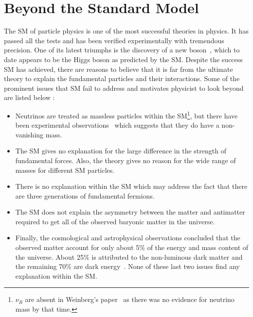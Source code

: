 \section{Beyond the Standard Model}
The SM of particle physics is one of the most successful theories in physics. It has passed all the tests and has been verified
experimentally with tremendous precision. One of its latest triumphs is the discovery of a new boson~\cite{Chatrchyan:2012xdj,Aad:2012tfa}, 
which to date appears to be the Higgs boson as predicted by the SM. Despite the success SM has achieved, there are reasons to believe that it is
far from the ultimate theory to explain the fundamental particles and their interactions. Some of the prominent issues that SM fail to address
and motivates physicist to look beyond are listed below :
\begin{itemize}
\item Neutrinos are treated as massless particles within the SM\footnote{$\nu_{R}$ are absent in Weinberg's paper~\cite{Weinberg:1967tq} as there was no 
evidence for neutrino mass by that time.}, but there have been experimental 
observations~\cite{Fukuda:1998mi,Fukuda:2001nk,Araki:2004mb,Michael:2006rx} which suggests that they do have a non-vanishing mass.

\item The SM gives no explanation for the large difference in the strength of fundamental forces. Also, the theory gives no reason for the wide 
range of masses for different SM particles. %

\item There is no explanation within the SM which may address the fact that there are three generations of fundamental fermions.
\item The SM does not explain the asymmetry between the matter and antimatter required to get all of the observed baryonic matter in the universe. 

\item Finally, the cosmological and astrophysical observations concluded that the observed matter account for only about 5\% of the energy
and mass content of the universe. About 25\% is attributed to the non-luminous dark matter and the remaining 70\% are dark 
energy~\cite{Riess:1998cb}. None of these last two issues find any explanation within the SM.
\end{itemize}

